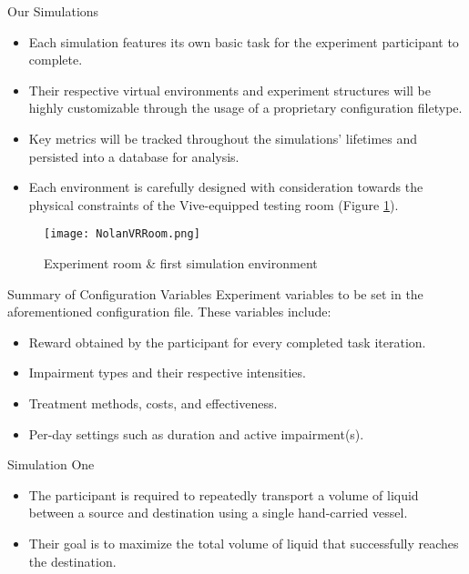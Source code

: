 \documentclass[22pt]{beamer}
\begin{document}
\begin{frame}[fragile]
\begin{textblock}{7.25}
\begin{block}{Our Simulations}\newline
\begin{itemize}
\item Each simulation features its own basic task for the experiment participant to complete.
\item Their respective virtual environments and experiment structures will be highly customizable through the usage of a proprietary configuration filetype. 
\item Key metrics will be tracked throughout the simulations' lifetimes and persisted into a database for analysis.
\item Each environment is carefully designed with consideration towards the physical constraints of the Vive-equipped testing room (Figure \ref{fig:room}).
\end{itemize}
\newline
\begin{figure}
  \texttt{[image: NolanVRRoom.png]}
  \caption{Experiment room \& first simulation environment}
\label{fig:room}
\end{figure}
\end{block}


\begin{block}{Summary of Configuration Variables}\newline
Experiment variables to be set in the aforementioned configuration file. These variables include:
\begin{itemize}
\item Reward obtained by the participant for every completed task iteration.
\item Impairment types and their respective intensities.
\item Treatment methods, costs, and effectiveness.
\item Per-day settings such as duration and active impairment(s).
\end{itemize}
\end{block}

\begin{block}{Simulation One}\newline
\begin{itemize}
\item The participant is required to repeatedly transport a
volume of liquid between a source and destination using a single hand-carried
vessel.
\item Their goal is to maximize the total volume of liquid that successfully
reaches the destination.
\end{itemize}


\end{block}
\end{textblock}
\end{frame}
\end{document}
